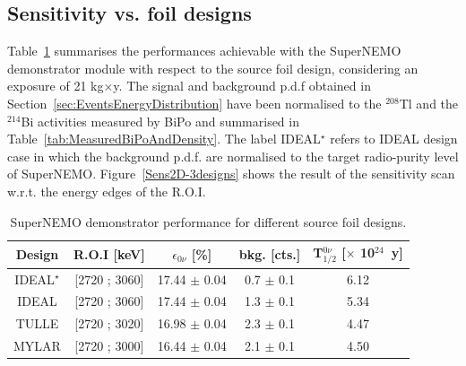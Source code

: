\documentclass[main.tex]{subfiles}
\begin{document}
\FloatBarrier


\subsection{Sensitivity vs. foil designs}\label{sec:SensitivityVsDesign}


\NI Table~\ref{Tab:SNperformanceDiffDesign} summarises the performances achievable with the SuperNEMO demonstrator module with respect to the source foil design, considering an exposure of 21 kg$\times$y. The signal and background p.d.f obtained in Section~\ref{sec:EventsEnergyDistribution} have been normalised to the $^{\text{208}}$Tl and the $^{\text{214}}$Bi activities measured by BiPo and summarised in Table~\ref{tab:MeasuredBiPoAndDensity}. The label IDEAL$^\star$ refers to IDEAL design case in which the background p.d.f. are normalised to the target radio-purity level of SuperNEMO. Figure~\ref{Sens2D-3designs} shows the result of the sensitivity scan w.r.t. the energy edges of the R.O.I.


\begin{table}[h!]
\centering
\begin{tabular}{c|c|c|c|c}
\toprule
Design & R.O.I [keV] & $\epsilon_{\text{0}\nu}$ [\%] & bkg. [cts.] &   T$_{\text{1/2}}^{\text{0}\nu}$ [$\times$ 10$^{\text{24}}$~y] \\[0.1cm]
\hline
IDEAL$^{\star}$ & [2720 ; 3060] & 17.44 $\pm$ 0.04 & 0.7 $\pm$ 0.1 & 6.12 \\  [0.1cm]
\hline
IDEAL           & [2720 ; 3060] & 17.44 $\pm$ 0.04 & 1.3 $\pm$ 0.1 & 5.34 \\  [0.1cm]
\hline
TULLE           & [2720 ; 3020] & 16.98 $\pm$ 0.04 & 2.3 $\pm$ 0.1 & 4.47 \\  [0.1cm]
\hline
MYLAR           & [2720 ; 3000] & 16.44 $\pm$ 0.04 & 2.1 $\pm$ 0.1 & 4.50 \\  [0.1cm]
\bottomrule
\end{tabular}
\caption{SuperNEMO demonstrator performance for different source foil designs.}
\label{Tab:SNperformanceDiffDesign}
\end{table}
\end{document}
